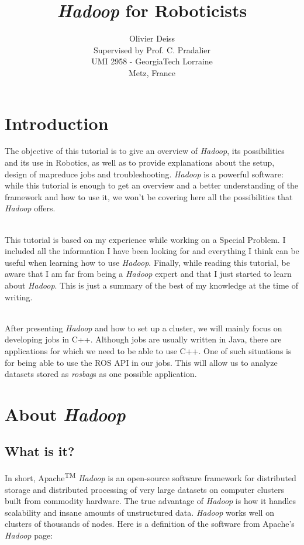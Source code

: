 \documentclass[a4paper, 12pt]{article}
\title{\textit{Hadoop} for Roboticists}
\author{Olivier Deiss\\
Supervised by Prof. C. Pradalier\\
UMI 2958 - GeorgiaTech Lorraine\\Metz, France}
\begin{document}
\begin{titlingpage}
\maketitle
\end{titlingpage}

\newpage
\tableofcontents
\newpage

\section{Introduction}

The objective of this tutorial is to give an overview of \textit{Hadoop}, its possibilities and its use in Robotics, as well as to provide explanations about the setup, design of mapreduce jobs and troubleshooting. \textit{Hadoop} is a powerful software: while this tutorial is enough to get an overview and a better understanding of the framework and how to use it, we won't be covering here all the possibilities that \textit{Hadoop} offers.

~\\
This tutorial is based on my experience while working on a Special Problem. I included all the information I have been looking for and everything I think can be useful when learning how to use \textit{Hadoop}. Finally, while reading this tutorial, be aware that I am far from being a \textit{Hadoop} expert and that I just started to learn about \textit{Hadoop}. This is just a summary of the best of my knowledge at the time of writing.

~\\
After presenting \textit{Hadoop} and how to set up a cluster, we will mainly focus on developing jobs in C++. Although jobs are usually written in Java, there are applications for which we need to be able to use C++. One of such situations is for being able to use the ROS API in our jobs. This will allow us to analyze datasets stored as \textit{rosbag}s as one possible application.

\section{About \textit{Hadoop}}

  \subsection{What is it?}

In short, Apache\textsuperscript{TM} \textit{Hadoop}\textsuperscript{\textregistered} is an open-source software framework for distributed storage and distributed processing of very large datasets on computer clusters built from commodity hardware. The true advantage of \textit{Hadoop} is how it handles scalability and insane amounts of unstructured data. \textit{Hadoop} works well on clusters of thousands of nodes. Here is a definition of the software from Apache's \textit{Hadoop} page:
\end{document}
